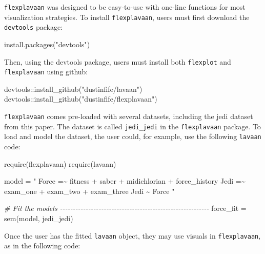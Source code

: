 \documentclass[
  english,
  man]{apa6}
\newenvironment{Shaded}{\begin{snugshade}}{\end{snugshade}}
\newcommand{\CommentTok}[1]{\textcolor[rgb]{0.56,0.35,0.01}{\textit{#1}}}
\newcommand{\FunctionTok}[1]{\textcolor[rgb]{0.00,0.00,0.00}{#1}}
\newcommand{\NormalTok}[1]{#1}
\newcommand{\OtherTok}[1]{\textcolor[rgb]{0.56,0.35,0.01}{#1}}
\newcommand{\SpecialCharTok}[1]{\textcolor[rgb]{0.00,0.00,0.00}{#1}}
\newcommand{\StringTok}[1]{\textcolor[rgb]{0.31,0.60,0.02}{#1}}
\begin{document}
\texttt{flexplavaan} was designed to be easy-to-use with one-line functions for most visualization strategies. To install \texttt{flexplavaan}, users must first download the \texttt{devtools} package:

\begin{Shaded}
\begin{Highlighting}[]
\FunctionTok{install.packages}\NormalTok{(}\StringTok{"devtools"}\NormalTok{)}
\end{Highlighting}
\end{Shaded}

Then, using the devtools package, users must install both \texttt{flexplot} and \texttt{flexplavaan} using github:

\begin{Shaded}
\begin{Highlighting}[]
\NormalTok{devtools}\SpecialCharTok{::}\FunctionTok{install\_github}\NormalTok{(}\StringTok{"dustinfife/lavaan"}\NormalTok{)}
\NormalTok{devtools}\SpecialCharTok{::}\FunctionTok{install\_github}\NormalTok{(}\StringTok{"dustinfife/flexplavaan"}\NormalTok{)}
\end{Highlighting}
\end{Shaded}

\texttt{flexplavaan} comes pre-loaded with several datasets, including the jedi dataset from this paper. The dataset is called \texttt{jedi\_jedi} in the \texttt{flexplavaan} package. To load and model the dataset, the user could, for example, use the following \texttt{lavaan} code:

\begin{Shaded}
\begin{Highlighting}[]
\FunctionTok{require}\NormalTok{(flexplavaan)}
\FunctionTok{require}\NormalTok{(lavaan)}

\NormalTok{model }\OtherTok{=} \StringTok{"}
\StringTok{Force =\textasciitilde{} fitness + saber + midichlorian + force\_history}
\StringTok{Jedi =\textasciitilde{} exam\_one + exam\_two + exam\_three}
\StringTok{Jedi \textasciitilde{} Force}
\StringTok{"}

\CommentTok{\# Fit the models {-}{-}{-}{-}{-}{-}{-}{-}{-}{-}{-}{-}{-}{-}{-}{-}{-}{-}{-}{-}{-}{-}{-}{-}{-}{-}{-}{-}{-}{-}{-}{-}{-}{-}{-}{-}{-}{-}{-}{-}{-}{-}{-}{-}{-}{-}{-}{-}{-}{-}{-}{-}{-}{-}{-}{-}{-}{-}}
\NormalTok{force\_fit }\OtherTok{=} \FunctionTok{sem}\NormalTok{(model, jedi\_jedi)}
\end{Highlighting}
\end{Shaded}

Once the user has the fitted \texttt{lavaan} object, they may use visuals in \texttt{flexplavaan}, as in the following code:
\end{document}

